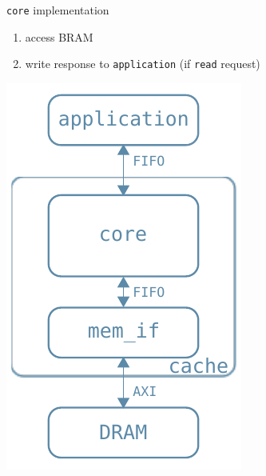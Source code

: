 \documentclass{beamer}
\begin{document}
\begin{frame}{\texttt{core} implementation}
\begin{minipage}{.7\textwidth}
\begin{enumerate}
\begin{itemize}
				\end{itemize}
			\item access BRAM
			\item write response to \texttt{application}
				(if \texttt{read} request)
		\end{enumerate}
	\end{minipage}
	\begin{minipage}{.29\textwidth}
		\begin{center}
			\includegraphics[width=.9\textwidth,height=.9\textheight,keepaspectratio]{internal_arch.pdf}
		\end{center}
	\end{minipage}
\end{frame}
\end{document}
